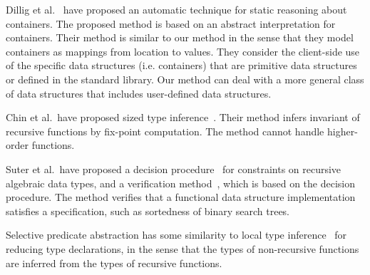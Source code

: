 Dillig et al.~\cite{Dillig2011} have proposed an automatic technique for
static reasoning about containers.  The proposed method is based on
an abstract interpretation for containers.  Their method is similar
to our method in the sense that they model containers as mappings
from location to values.  They consider the client-side use of the
specific data structures (i.e. containers) that are primitive data
structures or defined in the standard library.  Our method can deal with a
more general class of data structures that includes user-defined data
structures.

Chin et al.~have proposed sized type inference~\cite{Chin2003}.  Their
method infers invariant of recursive functions by fix-point
computation.  The method cannot handle higher-order functions.

Suter et al.~have proposed a decision procedure~\cite{Suter2010} for
constraints on recursive algebraic data types, and a verification
method~\cite{Suter2011}, which is based on the
decision procedure.  The method verifies that a functional data
structure implementation satisfies a specification, such as sortedness
of binary search trees.

Selective predicate abstraction has some similarity to local type
inference~\cite{Pierce2000} for reducing type declarations, in the sense
that the types of non-recursive functions are inferred from the types of
recursive functions.
